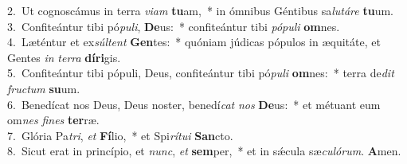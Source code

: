 {2.~}Ut cognoscámus in terra \textit{vi}\textit{am} \textbf{tu}am,~* in ómnibus Géntibus sa\textit{lu}\textit{tá}\textit{re} \textbf{tu}um.\\
{3.~}Confiteántur tibi pó\textit{pu}\textit{li}, \textbf{De}us:~* confiteántur tibi \textit{pó}\textit{pu}\textit{li} \textbf{om}nes.\\
{4.~}Læténtur et ex\textit{súl}\textit{tent} \textbf{Gen}tes:~* quóniam júdicas pópulos in æquitáte, et Gentes \textit{in} \textit{ter}\textit{ra} \textbf{dí}\textbf{ri}gis.\\
{5.~}Confiteántur tibi pópuli, Deus, confiteántur tibi pó\textit{pu}\textit{li} \textbf{om}nes:~* terra de\textit{dit} \textit{fru}\textit{ctum} \textbf{su}um.\\
{6.~}Benedícat nos Deus, Deus noster, benedí\textit{cat} \textit{nos} \textbf{De}us:~* et métuant eum om\textit{nes} \textit{fi}\textit{nes} \textbf{ter}ræ.\\
{7.~}Glória Pa\textit{tri}, \textit{et} \textbf{Fí}lio,~* et Spi\textit{rí}\textit{tu}\textit{i} \textbf{San}cto.\\
{8.~}Sicut erat in princípio, et \textit{nunc}, \textit{et} \textbf{sem}per,~* et in sǽcula sæ\textit{cu}\textit{ló}\textit{rum}. \textbf{A}men.\\

